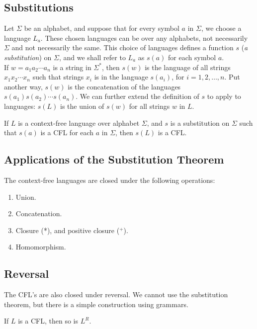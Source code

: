 \documentclass[]{article}
\begin{document}
  \subsection*{Substitutions}
    Let $\Sigma$ be an alphabet, and suppose that for every symbol $a$ in
    $\Sigma$, we choose a language $L_a$. These chosen languages can be over any
    alphabets, not necessarily $\Sigma$ and not necessarily the same. This
    choice of languages defines a function $s$ (\emph{a substitution}) on
    $\Sigma$, and we shall refer to $L_a$ as $s(a)$ for each symbol $a$. \\
    \indent If $w = a_1a_2\cdots{}a_n$ is a string in $\Sigma^*$, then $s(w)$ is
    the language of all strings $x_1x_2\cdots{}x_n$ such that strings $x_i$ is
    in the language $s(a_i)$, for $i = 1, 2,\ldots,n$. Put another way, $s(w)$
    is the concatenation of the languages $s(a_1)s(a_2)\cdots{}s(a_n)$. We can
    further extend the definition of $s$ to apply to languages: $s(L)$ is the
    union of $s(w)$ for all strings $w$ in $L$.
      \begin{thm}
        If $L$ is a context-free language over alphabet $\Sigma$, and $s$ is a
        substitution on $\Sigma$ such that $s(a)$ is a CFL for each $a$ in
        $\Sigma$, then $s(L)$ is a CFL.
      \end{thm}

  \subsection*{Applications of the Substitution Theorem}
    \begin{thm}
      The context-free languages are closed under the following operations:
        \begin{enumerate}
          \item Union.
          \item Concatenation.
          \item Closure (*), and positive closure ($^+$).
          \item Homomorphism.
        \end{enumerate}
    \end{thm}

  \subsection*{Reversal}
    The CFL's are also closed under reversal. We cannot use the substitution
    theorem, but there is a simple construction using grammars.
      \begin{thm}
        If $L$ is a CFL, then so is $L^R$.
      \end{thm}
\end{document}
